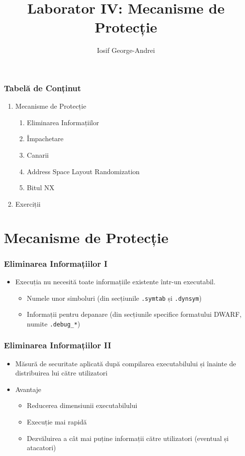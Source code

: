 \documentclass[xcolor={table}]{beamer}
\title{Laborator IV: Mecanisme de Protecție}
\subtitle{}
\author{Iosif George-Andrei}
\begin{document}
    \setcounter{showProgressBar}{0}
	\setcounter{showSlideNumbers}{0}
	\frame{\titlepage}

	\begin{frame}
		\frametitle{Tabelă de Conținut}\pause
		\begin{enumerate}[<+->]
			\item Mecanisme de Protecție
			    \begin{enumerate}
    			\item Eliminarea Informațiilor
    			\item Împachetare
    			\item Canarii
    			\item Address Space Layout Randomization
    			\item Bitul NX
			\end{enumerate}
			\item Exerciții
		\end{enumerate}
	\end{frame}

	\setcounter{framenumber}{0}
	\setcounter{showProgressBar}{1}
	\setcounter{showSlideNumbers}{1}
	\section{Mecanisme de Protecție}

	\begin{frame}
		\frametitle{Eliminarea Informațiilor I}\pause
		\begin{itemize}[<+->]
		    \item Execuția nu necesită toate informațiile existente într-un executabil.
		        \begin{itemize}
			        \item Numele unor simboluri (din secțiunile \texttt{.symtab} și \texttt{.dynsym})
			        \item Informații pentru depanare (din secțiunile specifice formatului DWARF, numite \texttt{.debug_*})
			    \end{itemize}
        \end{itemize}
    \end{frame}

    \begin{frame}
		\frametitle{Eliminarea Informațiilor II}\pause
	    \begin{itemize}[<+->]
	        \item Măsură de securitate aplicată după compilarea executabilului și înainte de distribuirea lui către utilizatori
			\item Avantaje
			    \begin{itemize}
			        \item Reducerea dimensiunii executabilului
			        \item Execuție mai rapidă
			        \item Dezvăluirea a cât mai puține informații către utilizatori (eventual și atacatori)
			    \end{itemize}
		\end{itemize}
	\end{frame}
	
\end{document}

